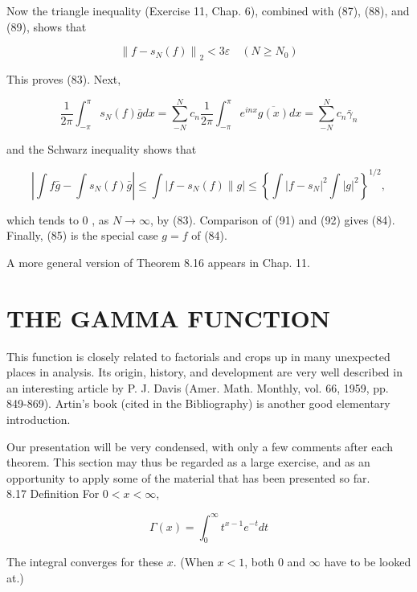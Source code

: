 \documentclass[10pt]{article}
\begin{document}
Now the triangle inequality (Exercise 11, Chap. 6), combined with (87), (88), and (89), shows that


\begin{equation*}
\left\|f-s_{N}(f)\right\|_{2}<3 \varepsilon \quad\left(N \geq N_{0}\right) \tag{90}
\end{equation*}


This proves (83). Next,


\begin{equation*}
\frac{1}{2 \pi} \int_{-\pi}^{\pi} s_{N}(f) \bar{g} d x=\sum_{-N}^{N} c_{n} \frac{1}{2 \pi} \int_{-\pi}^{\pi} e^{i n x} \overline{g(x)} d x=\sum_{-N}^{N} c_{n} \bar{\gamma}_{n} \tag{91}
\end{equation*}


and the Schwarz inequality shows that


\begin{equation*}
\left|\int f \bar{g}-\int s_{N}(f) \bar{g}\right| \leq \int\left|f-s_{N}(f) \| g\right| \leq\left\{\int\left|f-s_{N}\right|^{2} \int|g|^{2}\right\}^{1 / 2}, \tag{92}
\end{equation*}


which tends to 0 , as $N \rightarrow \infty$, by (83). Comparison of (91) and (92) gives (84). Finally, (85) is the special case $g=f$ of (84).

A more general version of Theorem 8.16 appears in Chap. 11.

\section*{THE GAMMA FUNCTION}
This function is closely related to factorials and crops up in many unexpected places in analysis. Its origin, history, and development are very well described in an interesting article by P. J. Davis (Amer. Math. Monthly, vol. 66, 1959, pp. 849-869). Artin's book (cited in the Bibliography) is another good elementary introduction.

Our presentation will be very condensed, with only a few comments after each theorem. This section may thus be regarded as a large exercise, and as an opportunity to apply some of the material that has been presented so far.\\
8.17 Definition For $0<x<\infty$,


\begin{equation*}
\Gamma(x)=\int_{0}^{\infty} t^{x-1} e^{-t} d t \tag{93}
\end{equation*}


The integral converges for these $x$. (When $x<1$, both 0 and $\infty$ have to be looked at.)
\end{document}
